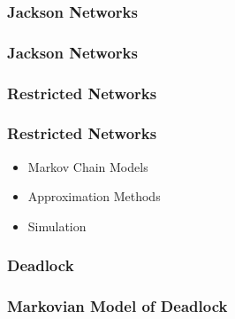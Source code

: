 \documentclass{beamer}
\begin{document}

\begin{frame}
  \frametitle{Jackson Networks}
  \begin{figure}
  
  \end{figure}
\end{frame}
\begin{frame}
  \frametitle{Jackson Networks}
  \begin{figure}
  
  \end{figure}
\end{frame}

\begin{frame}
  \frametitle{Restricted Networks}
  \begin{figure}
  
  \end{figure}
\end{frame}

\begin{frame}
  \frametitle{Restricted Networks}
  \begin{itemize}
    \item Markov Chain Models
    \item Approximation Methods
    \item Simulation
  \end{itemize}
\end{frame}



\begin{frame}
    \frametitle{Deadlock}
    \begin{figure}
    
    \end{figure}
\end{frame}

\begin{frame}
    \begin{figure}
    
    \end{figure}
\end{frame}


\begin{frame}
    \frametitle{Markovian Model of Deadlock}
    \newline
\end{frame}
\end{document}
